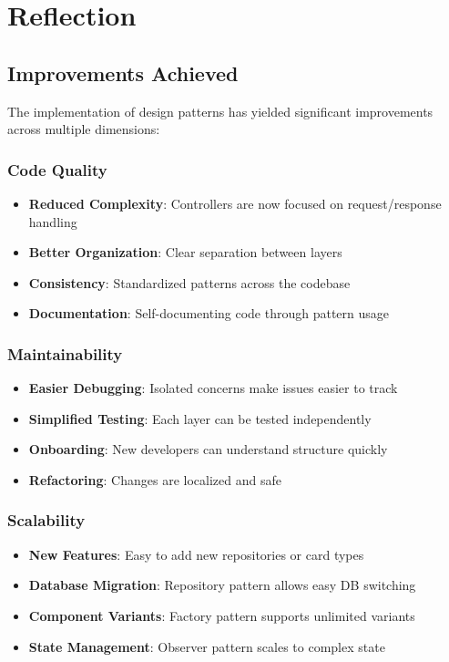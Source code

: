 \documentclass[12pt,a4paper]{article}
\begin{document}
\newpage

\section{Reflection}

\subsection{Improvements Achieved}

The implementation of design patterns has yielded significant improvements across multiple dimensions:

\subsubsection{Code Quality}
\begin{itemize}
    \item \textbf{Reduced Complexity}: Controllers are now focused on request/response handling
    \item \textbf{Better Organization}: Clear separation between layers
    \item \textbf{Consistency}: Standardized patterns across the codebase
    \item \textbf{Documentation}: Self-documenting code through pattern usage
\end{itemize}

\subsubsection{Maintainability}
\begin{itemize}
    \item \textbf{Easier Debugging}: Isolated concerns make issues easier to track
    \item \textbf{Simplified Testing}: Each layer can be tested independently
    \item \textbf{Onboarding}: New developers can understand structure quickly
    \item \textbf{Refactoring}: Changes are localized and safe
\end{itemize}

\subsubsection{Scalability}
\begin{itemize}
    \item \textbf{New Features}: Easy to add new repositories or card types
    \item \textbf{Database Migration}: Repository pattern allows easy DB switching
    \item \textbf{Component Variants}: Factory pattern supports unlimited variants
    \item \textbf{State Management}: Observer pattern scales to complex state
\end{itemize}
\end{document}
